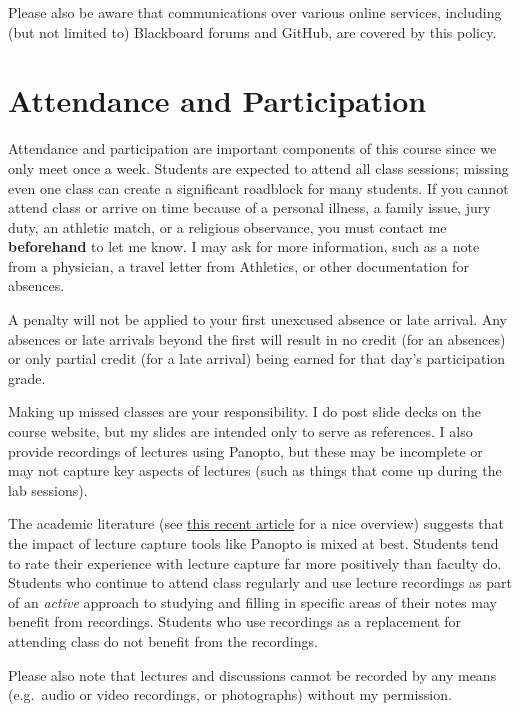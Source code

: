 \documentclass[
]{book}
\begin{document}
Please also be aware that communications over various online services, including (but not limited to) Blackboard forums and GitHub, are covered by this policy.

\hypertarget{attendance-and-participation}{%
\section{Attendance and Participation}\label{attendance-and-participation}}

Attendance and participation are important components of this course since we only meet once a week. Students are expected to attend all class sessions; missing even one class can create a significant roadblock for many students. If you cannot attend class or arrive on time because of a personal illness, a family issue, jury duty, an athletic match, or a religious observance, you must contact me \textbf{beforehand} to let me know. I may ask for more information, such as a note from a physician, a travel letter from Athletics, or other documentation for absences.

A penalty will not be applied to your first unexcused absence or late arrival. Any absences or late arrivals beyond the first will result in no credit (for an absences) or only partial credit (for a late arrival) being earned for that day's participation grade.

Making up missed classes are your responsibility. I do post slide decks on the course website, but my slides are intended only to serve as references. I also provide recordings of lectures using Panopto, but these may be incomplete or may not capture key aspects of lectures (such as things that come up during the lab sessions).

The academic literature (see \href{https://link.springer.com/article/10.1007/s10734-018-0275-9}{this recent article} for a nice overview) suggests that the impact of lecture capture tools like Panopto is mixed at best. Students tend to rate their experience with lecture capture far more positively than faculty do. Students who continue to attend class regularly and use lecture recordings as part of an \emph{active} approach to studying and filling in specific areas of their notes may benefit from recordings. Students who use recordings as a replacement for attending class do not benefit from the recordings.

Please also note that lectures and discussions cannot be recorded by any means (e.g.~audio or video recordings, or photographs) without my permission.
\end{document}
